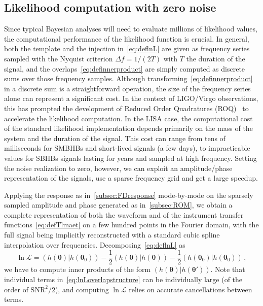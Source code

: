 \documentclass[aps,showpacs,twocolumn,prd,superscriptaddress,nofootinbib]{revtex4-1}
\newcommand{\be}{\begin{equation}}
\newcommand{\ee}{\end{equation}}
\newcommand\calL{{\mathcal{L}}}
\begin{document}

\subsection{Likelihood computation with zero noise}
\label{subsec:likelihood}

Since typical Bayesian analyses will need to evaluate millions of likelihood values, the computational performance of the likelihood function is crucial. In general, both the template and the injection in~\eqref{eq:deflnL} are given as frequency series sampled with the Nyquist criterion $\Delta f = 1/(2T)$ with $T$ the duration of the signal, and the overlaps~\eqref{eq:definnerproduct} are simply computed as discrete sums over those frequency samples. Although transforming~\eqref{eq:definnerproduct} in a discrete sum is a straightforward operation, the size of the frequency series alone can represent a significant cost. In the context of LIGO/Virgo observations, this has prompted the development of Reduced Order Quadratures (ROQ)~\cite{Smith+14, Canizares+14, Smith+16} to accelerate the likelihood computation. In the LISA case, the computational cost of the standard likelihood implementation depends primarily on the mass of the system and the duration of the signal. This cost can range from tens of milliseconds for SMBHBs and short-lived signals (a few days), to impracticable values for SBHBs signals lasting for years and sampled at high frequency. Setting the noise realization to zero, however, we can exploit an amplitude/phase representation of the signals, use a sparse frequency grid and get a large speedup.

Applying the response as in~\ref{subsec:FDresponse} mode-by-mode on the sparsely sampled amplitude and phase generated as in~\ref{subsec:ROM}, we obtain a complete representation of both the waveform and of the instrument transfer functions~\eqref{eq:defTlmaet} on a few hundred points in the Fourier domain, with the full signal being implicitly reconstructed with a standard cubic spline interpolation over frequencies. Decomposing~\eqref{eq:deflnL} as
\be\label{eq:lnLoverlapstructure}
	\ln \calL = \left( h(\bm{\theta}) | h(\bm{\theta}_{0}) \right)- \frac{1}{2} \left( h(\bm{\theta}) | h(\bm{\theta}) \right) - \frac{1}{2} \left( h(\bm{\theta}_{0}) | h(\bm{\theta}_{0}) \right) \,,
\ee
we have to compute inner products of the form $\left( h(\bm{\theta}) | h(\bm{\theta'}) \right)$. Note that individual terms in~\eqref{eq:lnLoverlapstructure} can be individually large (of the order of $\mathrm{SNR}^{2}/2$), and computing $\ln \calL$ relies on accurate cancellations between terms.
\end{document}
